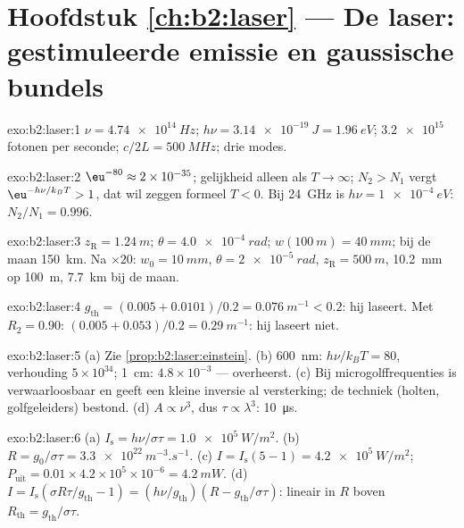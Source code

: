 \section*{Hoofdstuk \ref{ch:b2:laser} --- De laser: gestimuleerde emissie en
gaussische bundels}

\begin{solution}{exo:b2:laser:1}
$\nu = \qty{4.74e14}{Hz}$; $h\nu = \qty{3.14e-19}{J} = \qty{1.96}{eV}$;
$\qty{3.2e15}{}$ fotonen per seconde; $c/2L = \qty{500}{MHz}$; drie
modes.
\end{solution}

\begin{solution}{exo:b2:laser:2}
$\eu^{-80} \approx 2 \times 10^{-35}$; gelijkheid alleen als $T \to \infty$;
$N_2 > N_1$ vergt $\eu^{-h\nu/k_BT} > 1$, dat wil zeggen formeel $T < 0$. Bij
\qty{24}{GHz} is $h\nu = \qty{1e-4}{eV}$: $N_2/N_1 = 0.996$.
\end{solution}

\begin{solution}{exo:b2:laser:3}
$z_{\text{R}} = \qty{1.24}{m}$; $\theta = \qty{4.0e-4}{rad}$;
$w(\qty{100}{m}) =
\qty{40}{mm}$; bij de maan \qty{150}{km}. Na $\times 20$:
$w_0 = \qty{10}{mm}$,
$\theta = \qty{2e-5}{rad}$, $z_{\text{R}} = \qty{500}{m}$, \qty{10.2}{mm} op
\qty{100}{m}, \qty{7.7}{km} bij de maan.
\end{solution}

\begin{solution}{exo:b2:laser:4}
$g_{\text{th}} = (0.005 + 0.0101)/0.2 = \qty{0.076}{m^{-1}} < 0.2$: hij
laseert. Met $R_2 = 0.90$: $(0.005 + 0.053)/0.2 = \qty{0.29}{m^{-1}}$: hij
laseert niet.
\end{solution}

\begin{solution}{exo:b2:laser:5}
(a) Zie \cref{prop:b2:laser:einstein}. (b) \qty{600}{nm}: $h\nu/k_BT
= 80$,
verhouding $5 \times 10^{34}$; \qty{1}{cm}: $4.8 \times 10^{-3}$ ---
 overheerst. (c) Bij microgolffrequenties
is  verwaarloosbaar en geeft een kleine inversie al
versterking; de techniek (holten, golfgeleiders) bestond. (d)
$A \propto
\nu^3$, dus $\tau \propto \lambda^3$: \qty{10}{\micro s}.
\end{solution}

\begin{solution}{exo:b2:laser:6}
(a) $I_{\text{s}} = h\nu/\sigma\tau = \qty{1.0e5}{W/m^2}$. (b)
$R =
g_0/\sigma\tau = \qty{3.3e22}{m^{-3}.s^{-1}}$. (c)
$I = I_{\text{s}}(5 - 1) =
\qty{4.2e5}{W/m^2}$;
$P_{\text{uit}} = 0.01 \times 4.2 \times 10^5 \times
10^{-6} = \qty{4.2}{mW}$.
(d)
$I = I_{\text{s}}(\sigma R\tau/g_{\text{th}}
- 1) = (h\nu/g_{\text{th}})(R - g_{\text{th}}/\sigma\tau)$:
lineair in $R$
boven $R_{\text{th}} = g_{\text{th}}/\sigma\tau$.
\end{solution}

